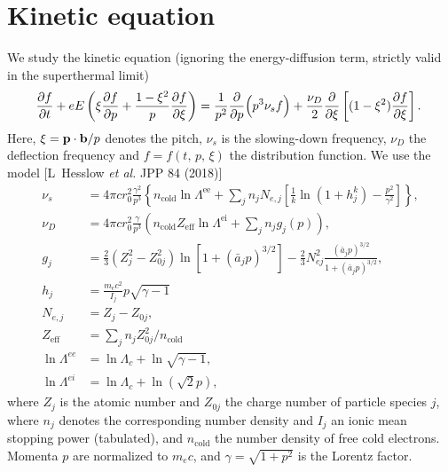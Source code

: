 \documentclass[11pt,a4paper]{article}
\newcommand{\sub}[1]{\ensuremath{_{\text{#1}}}}
\renewcommand{\b}[1]{\ensuremath{ {\bf #1 } }}
\begin{document}
\section{Kinetic equation}


We study the kinetic equation (ignoring the energy-diffusion term, strictly valid in the superthermal limit) 
\begin{align}
\hspace{-1mm}\frac{\partial f}{\partial t} + eE\left(\xi\frac{\partial f}{\partial p} + \frac{1-\xi^2}{p}\frac{\partial f}{\partial \xi}\right) = \frac{1}{p^2}\frac{\partial}{\partial p}\Big(p^3 \nu_s  f\Big) + \frac{\nu_D}{2}\frac{\partial}{\partial \xi}\left[(1-\xi^2)\frac{\partial f}{\partial \xi}\right].
\end{align}
Here, $\xi = \b{p}\cdot\b{b}/p$ denotes the pitch, $\nu_s$ is the slowing-down frequency, $\nu_D$ the deflection frequency and $f=f(t,\,p,\,\xi)$ the distribution function. We use the model [L~Hesslow \emph{et al.} JPP 84 (2018)]
\begin{align}
\nu_s &= 4\pi c r_0^2 \frac{\gamma^2}{p^3} \left\{n\sub{cold} \ln\Lambda^\text{ee} + \sum_j n_j N_{e,j}\left[\frac{1}{k}\ln(1+ h_j^k)  - \frac{p^2}{\gamma^2}\right]\right\} , \nonumber \\
\nu_D &= 4\pi c r_0^2\frac{\gamma}{p^3} \left( n\sub{cold} Z\sub{eff} \ln\Lambda^\text{ei} + \sum_j n_j g_j(p) \right), \nonumber \\
g_j &= \frac{2}{3} (Z_j^2-Z_{0j}^2)\ln[1+ (\bar{a}_jp)^{3/2}] - \frac{2}{3}N_{ej}^2\frac{(\bar{a}_j p)^{3/2}}{1+(\bar{a}_j p)^{3/2}}, \nonumber \\
h_j &= \frac{m_e c^2}{I_j}p\sqrt{\gamma-1}\nonumber \\
N_{e,j} &= Z_j-Z_{0j}, \nonumber \\
Z\sub{eff} &= \sum_j n_j Z_{0j}^2/n\sub{cold}  \nonumber \\
\ln\Lambda^{ee} &= \ln\Lambda_c + \ln\sqrt{\gamma-1}, \nonumber \\
\ln\Lambda^{ei} &= \ln\Lambda_c + \ln(\sqrt{2}p), 
\end{align}
where $Z_j$ is the atomic number and $Z_{0j}$ the charge number of particle species $j$, where $n_j$ denotes the corresponding number density and $I_j$ an ionic mean stopping power (tabulated), and $n\sub{cold}$ the number density of free cold electrons. Momenta $p$ are normalized to $m_e c$, and $\gamma = \sqrt{1+p^2}$ is the Lorentz factor. 


\end{document}
